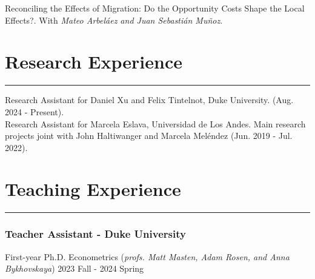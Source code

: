 \documentclass[12pt, letterpaper]{article}
\begin{document}
\noindent Reconciling the Effects of Migration: Do the Opportunity Costs Shape the Local Effects?. With \textit{Mateo Arbeláez and Juan Sebastián Muñoz}. \\ [-3mm]




\vspace{-6mm}
\newpage

\section*{Research Experience}
\vspace*{-8mm}
\noindent \rule{\linewidth}{0.2mm}
\noindent
Research Assistant for Daniel Xu and Felix Tintelnot, Duke University. (Aug. 2024 - Present). \\ [2mm]
Research Assistant for Marcela Eslava, Universidad de Los Andes. Main research projects joint with John Haltiwanger and Marcela Meléndez (Jun. 2019 - Jul. 2022).  \\ 

\vspace{-6mm}


\section*{Teaching Experience}
\vspace*{-8mm}
\noindent \rule{\linewidth}{0.2mm}
\vspace*{-10mm}
\subsubsection*{Teacher Assistant - Duke University}
\vspace*{-1mm}
\noindent 
First-year Ph.D. Econometrics \hspace{5mm}  (\textit{profs. Matt Masten, Adam Rosen, and Anna Bykhovskaya}) \hfill 2023 Fall - 2024 Spring \\
\vspace*{-7mm}
\end{document}
